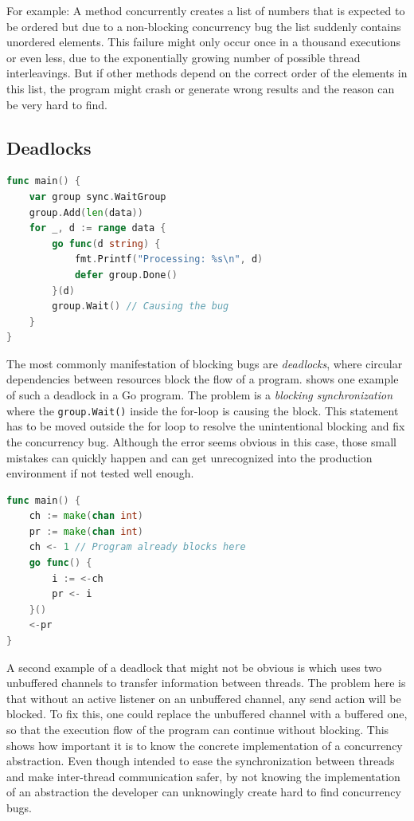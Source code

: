 \documentclass[conference]{IEEEtran}
\begin{document}
For example: A method concurrently creates a list of numbers that is expected to be ordered but due to a non-blocking concurrency bug the list suddenly contains unordered elements.
This failure might only occur once in a thousand executions or even less, due to the exponentially growing number of possible thread interleavings.
But if other methods depend on the correct order of the elements in this list, the program might crash or generate wrong results and the reason can be very hard to find.

\subsection{Deadlocks}
\begin{lstlisting}[float=h, language=Go, label=lst:deadlockWG, caption=Deadlock caused by waiting for the \emph{WaitGroup} at a wrong location -- based on \cite{tu2019go}]
func main() {
    var group sync.WaitGroup
    group.Add(len(data))
    for _, d := range data {
        go func(d string) {
            fmt.Printf("Processing: %s\n", d)
            defer group.Done()
        }(d)
        group.Wait() // Causing the bug
    }
}
\end{lstlisting}

The most commonly manifestation of blocking bugs are \emph{deadlocks}, where circular dependencies between resources block the flow of a program.
 shows one example of such a deadlock in a Go program.
The problem is a \emph{blocking synchronization} where the \lstinline{group.Wait()} inside the for-loop is causing the block.
This statement has to be moved outside the for loop to resolve the unintentional blocking and fix the concurrency bug.
Although the error seems obvious in this case, those small mistakes can quickly happen and can get unrecognized into the production environment if not tested well enough.

\begin{lstlisting}[float=h, language=Go, label=lst:deadlockCh, caption={Deadlock caused by misuse of an \emph{unbuffered Channel}}]
func main() {
    ch := make(chan int)
    pr := make(chan int)
    ch <- 1 // Program already blocks here
    go func() {
        i := <-ch
        pr <- i
    }()
    <-pr
}
\end{lstlisting}

A second example of a deadlock that might not be obvious is  which uses two unbuffered channels to transfer information between threads.
The problem here is that without an active listener on an unbuffered channel, any send action will be blocked.
To fix this, one could replace the unbuffered channel with a buffered one, so that the execution flow of the program can continue without blocking.
This shows how important it is to know the concrete implementation of a concurrency abstraction.
Even though intended to ease the synchronization between threads and make inter-thread communication safer, by not knowing the implementation of an abstraction the developer can unknowingly create hard to find concurrency bugs.
\end{document}
